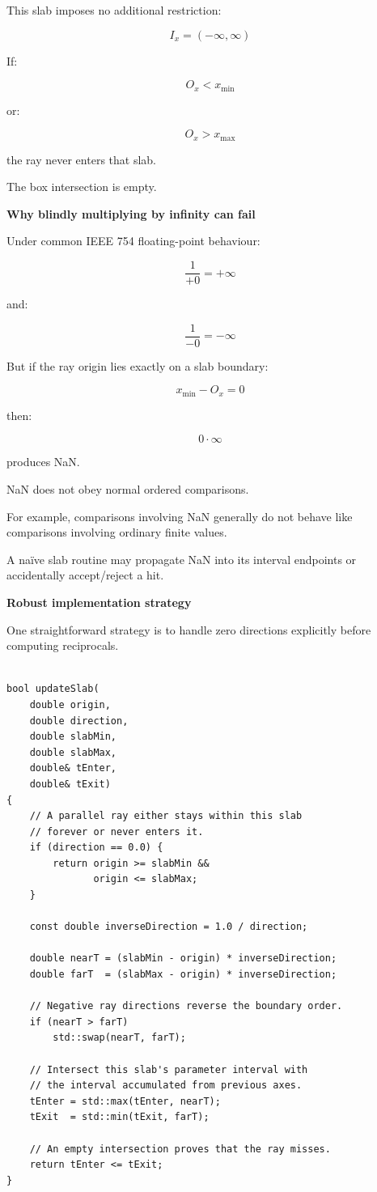 This slab imposes no additional restriction:

\[
I_x=(-\infty,\infty)
\]

If:

\[
O_x<x_{\min}
\]

or:

\[
O_x>x_{\max}
\]

the ray never enters that slab.

The box intersection is empty.

\textbf{Why blindly multiplying by infinity can fail}

Under common IEEE 754 floating-point behaviour:

\[
\frac1{+0}=+\infty
\]

and:

\[
\frac1{-0}=-\infty
\]

But if the ray origin lies exactly on a slab boundary:

\[
x_{\min}-O_x=0
\]

then:

\[
0\cdot\infty
\]

produces NaN.

NaN does not obey normal ordered comparisons.

For example, comparisons involving NaN generally do not behave like comparisons involving ordinary finite values.

A naïve slab routine may propagate NaN into its interval endpoints or accidentally accept/reject a hit.

\textbf{Robust implementation strategy}

One straightforward strategy is to handle zero directions explicitly before computing reciprocals.

\begin{verbatim}

bool updateSlab(
    double origin,
    double direction,
    double slabMin,
    double slabMax,
    double& tEnter,
    double& tExit)
{
    // A parallel ray either stays within this slab
    // forever or never enters it.
    if (direction == 0.0) {
        return origin >= slabMin &&
               origin <= slabMax;
    }

    const double inverseDirection = 1.0 / direction;

    double nearT = (slabMin - origin) * inverseDirection;
    double farT  = (slabMax - origin) * inverseDirection;

    // Negative ray directions reverse the boundary order.
    if (nearT > farT)
        std::swap(nearT, farT);

    // Intersect this slab's parameter interval with
    // the interval accumulated from previous axes.
    tEnter = std::max(tEnter, nearT);
    tExit  = std::min(tExit, farT);

    // An empty intersection proves that the ray misses.
    return tEnter <= tExit;
}
\end{verbatim}

